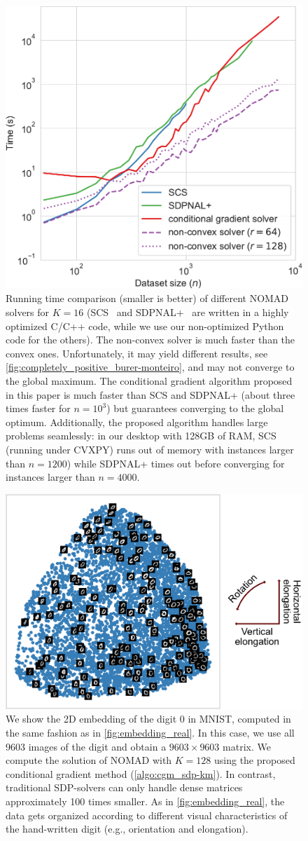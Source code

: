 \documentclass[twoside,11pt]{article}
\begin{document}
\begin{figure}
	\centering
	\includegraphics[width=.45\linewidth]{embedding/mnist_timing}
		
	\caption{Running time comparison (smaller is better) of different NOMAD solvers for $K=16$ (SCS~\citep{SCSsolver} and SDPNAL+~\citep{sdpnalplus} are written in a highly optimized C/C++ code, while we use our non-optimized Python code for the others). The non-convex solver is much faster than the convex ones. Unfortunately, it may yield different results, see \cref{fig:completely_positive_burer-monteiro}, and may not converge to the global maximum.
    The conditional gradient algorithm proposed in this paper is much faster than SCS and SDPNAL+ (about three times faster for $n=10^3$) but guarantees converging to the global optimum.
    Additionally, the proposed algorithm handles large problems seamlessly: in our desktop with 128GB of RAM, SCS (running under CVXPY) runs out of memory with instances larger than $n=1200$) while SDPNAL+ times out before converging for instances larger than $n=4000$.
    }
	\label{fig:mnist_timing}
\end{figure}

\begin{figure}
	\centering
	\includegraphics[width=.6\linewidth]{embedding/mnist_n9603_k128_embedding.png}
		
	\caption{We show the 2D embedding of the digit 0 in MNIST, computed in the same fashion as in \cref{fig:embedding_real}. In this case, we use all 9603 images of the digit and obtain a $9603 \times 9603$ matrix. We compute the solution of NOMAD with $K=128$ using the proposed conditional gradient method (\cref{algo:cgm_sdp-km}). In contrast, traditional SDP-solvers can only handle dense matrices approximately 100 times smaller.
    As in \cref{fig:embedding_real}, the data gets organized according to different visual characteristics of the hand-written digit (e.g., orientation and elongation).
    }
	\label{fig:mnist_n9603_k128_embedding}
\end{figure}
\end{document}
